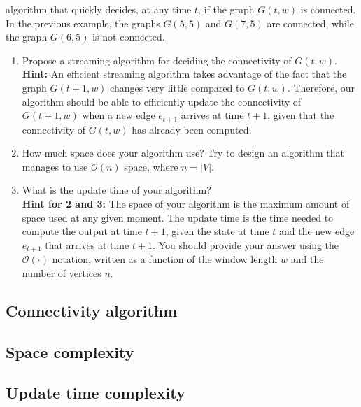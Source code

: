 algorithm that quickly decides, at any time $t$, if the graph $G(t,w)$ is connected. In the previous example, the graphs $G(5,5)$ and $G(7,5)$ are connected, while the graph $G(6,5)$ is not connected.
\begin{enumerate}
	\item Propose a streaming algorithm for deciding the connectivity of $G(t,w)$.\\
	\textbf{Hint:} An efficient streaming algorithm takes advantage of the fact that the graph $G(t+1,w)$ changes very little compared to $G(t,w)$. Therefore, our algorithm should be able to efficiently update the connectivity of $G(t + 1,w)$ when a new edge $e_{t+1}$ arrives at time $t + 1$, given that the connectivity of $G(t,w)$ has already been computed.
	\item How much space does your algorithm use? Try to design an algorithm that manages to use
	$\mathcal{O}(n)$ space, where $n = |V|$.
	\item What is the update time of your algorithm?\\
	\textbf{Hint for 2 and 3:} The space of your algorithm is the maximum amount of space used at
	any given moment. The update time is the time needed to compute the output at time $t+1$,
	given the state at time $t$ and the new edge $e_{t+1}$ that arrives at time $t + 1$. You should provide your answer using the $\mathcal{O}(\cdot)$ notation, written as a function of the window length $w$ and the number of vertices $n$.
\end{enumerate}

\subsection{Connectivity algorithm}

\subsection{Space complexity}

\subsection{Update time complexity}